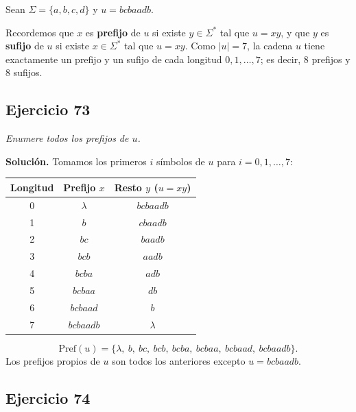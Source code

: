 
\noindent Sean $\Sigma = \{a, b, c, d\}$ y $u = bcbaadb$.

\medskip
\noindent Recordemos que $x$ es \textbf{prefijo} de $u$ si existe $y \in \Sigma^*$ tal
que $u = xy$, y que $y$ es \textbf{sufijo} de $u$ si existe $x \in \Sigma^*$ tal que
$u = xy$. Como $|u| = 7$, la cadena $u$ tiene exactamente un prefijo y un sufijo de
cada longitud $0, 1, \dots, 7$; es decir, $8$ prefijos y $8$ sufijos.

\subsection*{Ejercicio 73}

\noindent\textit{Enumere todos los prefijos de $u$.}

\medskip
\noindent\textbf{Solución.} Tomamos los primeros $i$ símbolos de $u$ para
$i = 0, 1, \dots, 7$:

\begin{center}
    \begin{tabular}{|c|c|c|}
        \hline
        \textbf{Longitud} & \textbf{Prefijo $x$} & \textbf{Resto $y$ ($u = xy$)} \\
        \hline
        0 & $\lambda$  & $bcbaadb$ \\
        1 & $b$        & $cbaadb$ \\
        2 & $bc$       & $baadb$ \\
        3 & $bcb$      & $aadb$ \\
        4 & $bcba$     & $adb$ \\
        5 & $bcbaa$    & $db$ \\
        6 & $bcbaad$   & $b$ \\
        7 & $bcbaadb$  & $\lambda$ \\
        \hline
    \end{tabular}
\end{center}

\[
\text{Pref}(u) = \{\lambda,\ b,\ bc,\ bcb,\ bcba,\ bcbaa,\ bcbaad,\ bcbaadb\}.
\]
Los prefijos propios de $u$ son todos los anteriores excepto $u = bcbaadb$.

\subsection*{Ejercicio 74}

